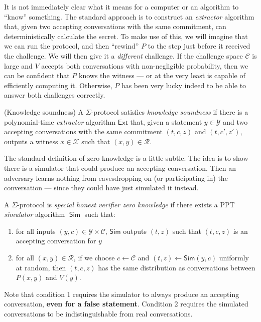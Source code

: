 \documentclass[12pt,a4paper]{article}
\DeclareMathOperator{\Sim}{\mathsf{Sim}}
\theoremstyle{definition}
\begin{document}
It is not immediately clear what it means for a computer or an algorithm to ``know'' something. The standard approach is to construct an \textit{extractor} algorithm that, given two accepting conversations with the same commitment, can deterministically calculate the secret. To make use of this, we will imagine that we can run the protocol, and then ``rewind'' $P$ to the step just before it received the challenge. We will then give it a \textit{different} challenge. If the challenge space $\mathcal{C}$ is large and $V$ accepts both conversations with non-negligible probability, then we can be confident that $P$ knows the witness --- or at the very least is capable of efficiently computing it. Otherwise, $P$ has been very lucky indeed to be able to answer both challenges correctly.
\begin{definition}(Knowledge soundness)
    A $\Sigma$-protocol satisfies \textit{knowledge soundness} if there is a polynomial-time \textit{extractor} algorithm $\mathsf{Ext}$ that, given a statement $y\in\mathcal{Y}$ and two accepting conversations with the same commitment $(t, c, z)$ and $(t, c', z')$, outputs a witness $x\in\mathcal{X}$ such that $(x, y)\in\mathcal{R}$.
\end{definition}

The standard definition of zero-knowledge is a little subtle. The idea is to show there is a simulator that could produce an accepting conversation. Then an adversary learns nothing from eavesdropping on (or participating in) the conversation --- since they could have just simulated it instead.
\begin{definition}
    A $\Sigma$-protocol is \textit{special honest verifier zero knowledge} if there exists a PPT \textit{simulator} algorithm $\Sim$ such that:
    \begin{enumerate}
        \item for all inputs $(y, c)\in\mathcal{Y}\times\mathcal{C}$, $\mathsf{Sim}$ outputs $(t, z)$ such that $(t, c, z)$ is an accepting conversation for $y$
        \item for all $(x, y)\in\mathcal{R}$, if we choose $c\leftarrow\mathcal{C}$ and $(t, z)\leftarrow\mathsf{Sim}(y, c)$ uniformly at random, then $(t, c, z)$ has the same distribution as conversations between $P(x, y)$ and $V(y)$.
    \end{enumerate}
\end{definition}
Note that condition 1 requires the simulator to always produce an accepting conversation, \textbf{even for a false statement}. Condition 2 requires the simulated conversations to be indistinguishable from real conversations.
\end{document}
